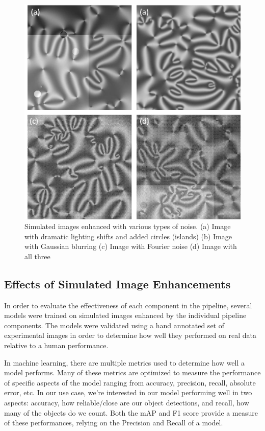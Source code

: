 \documentclass[prl,reprint,showpacs,floatfix,nofootinbib]{revtex4-1}
\begin{document}
\begin{figure}
  \includegraphics[width=\linewidth]{imageEnhance.png}
  \caption{Simulated images enhanced with various types of noise. (a) Image with dramatic lighting shifts and added circles (islands) (b) Image with Gaussian blurring (c) Image with Fourier noise (d) Image with all three}
  \label{fig:Standardization and Noise}
\end{figure}

\subsection{Effects of Simulated Image Enhancements}

In order to evaluate the effectiveness of each component in the pipeline, several models were trained on simulated images enhanced by the individual pipeline components. The models were validated using a hand annotated set of experimental images in order to determine how well they performed on real data relative to a human performance.

In machine learning, there are multiple metrics used to determine how well a model performs. Many of these metrics are optimized to measure the performance of specific aspects of the model ranging from accuracy, precision, recall, absolute error, etc. In our use case, we're interested in our model performing well in two aspects: accuracy, how reliable/close are our object detections, and recall, how many of the objects do we count. Both the mAP and F1 score provide a measure of these performances, relying on the Precision and Recall of a model.
\end{document}
